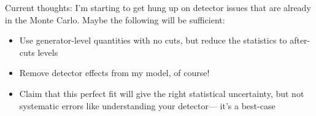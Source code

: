 \documentclass[landscape]{article}
\begin{document}
\vfill

Current thoughts: I'm starting to get hung up on detector issues that
are already in the Monte Carlo.  Maybe the following will be sufficient:

\vspace{1 cm}

\begin{itemize}

  \item Use generator-level quantities with no cuts, but reduce the
  statistics to after-cuts levels

  \item Remove detector effects from my model, of course!

  \item Claim that this perfect fit will give the right statistical
  uncertainty, but not systematic errors like understanding your
  detector--- it's a best-case

\end{itemize}

\vfill

\mbox{ }

\vfill
\end{document}
